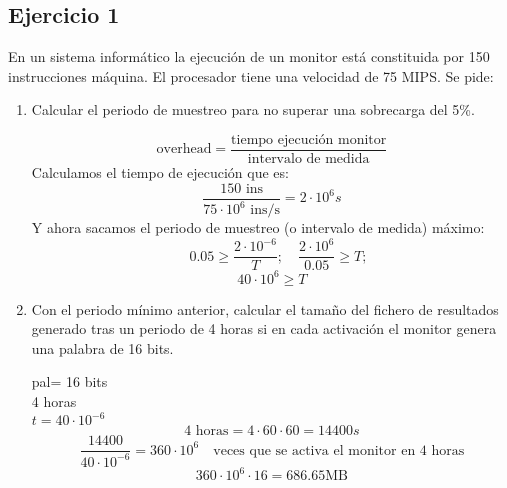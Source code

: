 \subsection{Ejercicio 1}
\noindent
En un sistema informático la ejecución de un monitor está constituida por 150 instrucciones máquina. El procesador tiene una velocidad de 75 MIPS. Se pide:
\begin{enumerate}
    \item Calcular el periodo de muestreo para no superar una sobrecarga del 5\%.
\begin{tcolorbox}[colback=white,colframe=cyan!50!black,fonttitle=\bfseries]
\[
\text{overhead}=\dfrac{\text{tiempo ejecución monitor}}{\text{intervalo de medida}}
\]
Calculamos el tiempo de ejecución que es:
\[
\dfrac{150\text{ ins}}{75\cdot 10^6\text{ ins/s}}=2\cdot 10^6 s
\]
Y ahora sacamos el periodo de muestreo (o intervalo de medida) máximo:
\[\quad 0.05\geq \dfrac{2\cdot 10^{-6}}{T}; \quad \dfrac{2\cdot 10^6}{0.05}\geq T;\]
\[
40\cdot 10^6\geq T
\]
\end{tcolorbox}    
    \item Con el periodo mínimo anterior, calcular el tamaño del fichero de resultados generado tras un periodo de 4 horas si en cada activación el monitor genera una palabra de 16 bits.
\begin{tcolorbox}[colback=white,colframe=cyan!50!black,fonttitle=\bfseries]
pal= 16 bits\\
4 horas\\
$t=40\cdot 10^{-6}$
\[
4\text{ horas}=4\cdot 60\cdot 60=14400s
\]
\[
\dfrac{14400}{40\cdot 10^{-6}}=360\cdot 10^6 \quad\text{veces que se activa el monitor en 4 horas}
\]
\[
360\cdot 10^6\cdot 16=686.65\text{MB}
\]
\end{tcolorbox}    
\end{enumerate}
